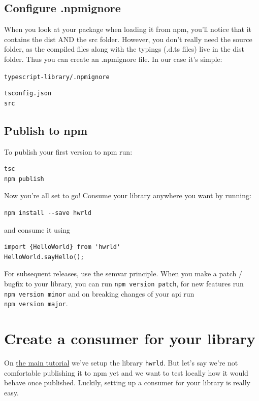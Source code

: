 \documentclass[12pt,a4paper]{article}
\newcommand{\filelabel}[1]{{\footnotesize\color{dkgreen}\texttt{#1}}{\vspace{-0.2cm}}}
\begin{document}
\subsection{\texorpdfstring{ Configure
.npmignore}{Configure .npmignore}}\label{step-5-configure-.npmignore}

When you look at your package when loading it from npm, you'll notice
that it contains the dist AND the src folder. However, you don't really
need the source folder, as the compiled files along with the typings
(.d.ts files) live in the dist folder. Thus you can create an .npmignore
file. In our case it's simple:

\filelabel{typescript-library/.npmignore}
\begin{lstlisting}
tsconfig.json
src
\end{lstlisting}

\subsection{\texorpdfstring{ Publish to
npm}{Publish to npm}}\label{step-6-publish-to-npm}

To publish your first version to npm run:

\begin{lstlisting}
tsc
npm publish
\end{lstlisting}

Now you're all set to go! Consume your library anywhere you want by
running:

\begin{lstlisting}
npm install --save hwrld
\end{lstlisting}

and consume it using

\begin{lstlisting}
import {HelloWorld} from 'hwrld'
HelloWorld.sayHello();
\end{lstlisting}

For subsequent releases, use the semvar principle. When you make a patch
/ bugfix to your library, you can run \texttt{npm\ version\ patch}, for
new features run \texttt{npm\ version\ minor} and on breaking changes of
your api run \texttt{npm\ version\ major}.


\section{Create a consumer for your
library}\label{create-a-consumer-for-your-library}

On \href{/}{the main tutorial} we've setup the library
\texttt{\textquotesingle{}hwrld\textquotesingle{}}. But let's say we're
not comfortable publishing it to npm yet and we want to test locally how
it would behave once published. Luckily, setting up a consumer for your
library is really easy.
\end{document}

